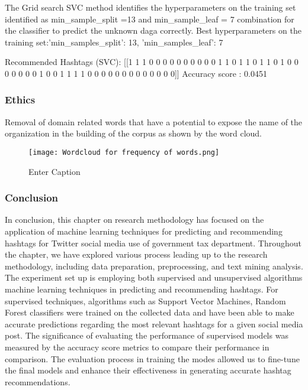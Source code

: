 
The Grid search SVC method identifies the hyperparameters on the training set identified as min_sample_split =13 and min_sample_leaf = 7 combination for the classifier to predict the unknown daga correctly.  
Best hyperparameters on the training set:{'min_samples_split': 13, 'min_samples_leaf': 7}

Recommended Hashtags (SVC): [[1 1 1 0 0 0 0 0 0 0 0 0 0 1 1 0 1 1 0 1 1 0 1 0 0 0 0 0 0 0 1 0 0 1 1 1 1 0 0 0 0 0 0 0 0 0 0 0 0 0]]
Accuracy score : 0.0451

\subsubsection{Ethics}

Removal of domain related words that have a potential to expose the name of the organization in the building of the corpus as shown by the word cloud.

\begin{figure}
    \centering
    \texttt{[image: Wordcloud for frequency of words.png]}
    \caption{Enter Caption}
    \label{fig:enter-label}
\end{figure}

\subsubsection{Conclusion}

In conclusion, this chapter on research methodology has focused on the application of machine learning techniques for predicting and recommending hashtags for Twitter social media use of government tax department. Throughout the chapter, we have explored various process leading up to the research methodology, including data preparation, preprocessing, and text mining analysis.  The experiment set up is employing both supervised and unsupervised algorithms machine learning techniques in predicting and recommending hashtags.  For supervised techniques, algorithms such as Support Vector Machines, Random Forest classifiers were trained on the collected data and have been able to make accurate predictions regarding the most relevant hashtags for a given social media post.  The significance of evaluating the performance of supervised models was measured by the accuracy score metrics to compare their performance in comparison.  The evaluation process in training the modes allowed us to fine-tune the final models and enhance their effectiveness in generating accurate hashtag recommendations.

